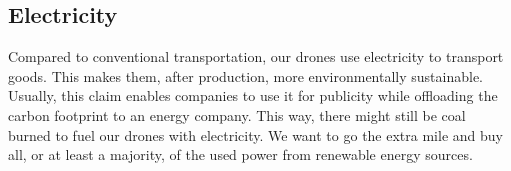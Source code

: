 \subsection{Electricity}
Compared to conventional transportation, our drones use electricity to transport goods. This makes them, after production, more environmentally sustainable. Usually, this claim enables companies to use it for publicity while offloading the carbon footprint to an energy company. This way, there might still be coal burned to fuel our drones with electricity.
\newline
We want to go the extra mile and buy all, or at least a majority, of the used power from renewable energy sources.
